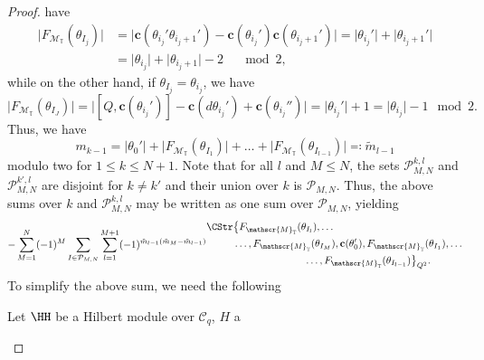 \documentclass[a4paper, english, 12pt, bibliography=totocnumbered,
index=totoc]{scrartcl}
\begin{document}
\begin{proof}
	have
	\begin{align*}
		\lvert F_{\mathscr{M}_{\mathbb{T}}}(\theta_{I_j}) \rvert & =
		\lvert \mathbf{c}(\theta_{i_j}' \theta_{i_j + 1}') -
		\mathbf{c}(\theta_{i_j}')\mathbf{c}(\theta_{i_j + 1}') \rvert =
		\lvert \theta_{i_j}' \rvert + \lvert \theta_{i_j + 1}' \rvert \\
		& = \lvert \theta_{i_j} \rvert + \lvert \theta_{i_j + 1} \rvert - 2
		\quad \mod 2,
	\end{align*}
	while on the other hand, if $\theta_{I_j} = \theta_{i_j}$, we have
	\begin{equation*}
		\lvert F_{\mathscr{M}_{\mathbb{T}}}(\theta_{I_J}) \rvert =
		\lvert [Q, \mathbf{c}(\theta_{i_j}')] -
		\mathbf{c}(d
		\theta_{i_j}') + \mathbf{c}(\theta_{i_j}'') \rvert = \lvert
		\theta_{i_j}' \rvert + 1 = \lvert \theta_{i_j} \rvert - 1 \mod 2.
	\end{equation*}
	Thus, we have
	\begin{equation*}
		m_{k-1} = \lvert \theta_0' \rvert + \lvert
		F_{\mathscr{M}_{\mathbb{T}}}(\theta_{I_1}) \rvert + \ldots +
		\lvert F_{\mathscr{M}_{\mathbb{T}}}(\theta_{I_{l-1}}) \rvert
		\eqqcolon \tilde{m}_{l-1}
	\end{equation*}
	modulo two for $1 \leq k \leq N + 1$.
	Note that for all $l$ and $M \leq N$, the sets $\mathcal{P}_{M,
	N}^{k, l}$ and $\mathcal{P}_{M,
	N}^{k', l}$ are disjoint for $k \neq k'$ and their union over $k$ is  
	$\mathcal{P}_{M, N}$.
	Thus, the above sums over $k$ and $\mathcal{P}_{M, N}^{k, l}$ may be 
	written as one sum over $\mathcal{P}_{M, N}$, yielding
	\begin{equation}\label{Chern pullback long sum}
		- \sum_{M=1}^N (-1)^M \sum_{I \in \mathcal{P}_{M, N}} \sum_{l=1}^{M+1}
		(-1)^{\tilde{m}_{l-1}(\tilde{m}_M - \tilde{m}_{l-1})}
		\begin{aligned}
			\CStr
			&\bigl\{F_{\mathscr{M}_{\mathbb{T}}}(\theta_{I_{l}}), \dots
			\\
			& \dots, F_{\mathscr{M}_{\mathbb{T}}}(\theta_{I_M}),
			\mathbf{c}(\theta_0^\prime),
			F_{\mathscr{M}_{\mathbb{T}}}(\theta_{I_1}), \dots \\
			&~~~~~~~~~~~~~~~~~~~~~\dots,
			F_{\mathscr{M}_{\mathbb{T}}}(\theta_{I_{l-1}})
			\bigr\}_{Q^2}.
		\end{aligned}
	\end{equation}
	To simplify the above sum, we need the following
	\begin{lem}\label{Clifford trace cyclic sum property}
		Let $\HH$ be a Hilbert module over $\mathcal{C}_q$, $H$ a

\end{lem}
\end{proof}
\end{document}
